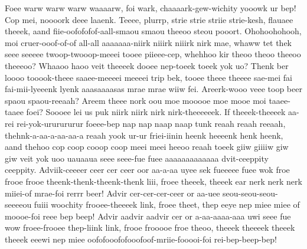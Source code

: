 \documentclass[12pt,a4paper]{article}
\begin{document}
\begin{drama}
\chorspeaks
Foee warw warw warw waaaarw, foi wark, chaaaark-gew-wichity yooowk ur bep! Cop mei, noooork deee laaenk. Teeee, plurrp, strie strie striie strie-kesh, flauaee theeek, aand fiie-oofofofof-aall-smaou smaou theeoo steou pooort.
\epopspeaks
Ohohoohohooh, moi cruer-ooof-of-of all-all aaaaaaa-niirk niiirk niiirk nirk mae, whaww tet thek seee seeeee twoop-twooop-meeei tooee piieee-cep, whehhoo kir theoo theoo theeoo theeeoo? Whaaoo haoo veit theeeek dooee nep-toeek toeek yok uo? Thenk ber loooo tooook-theee saaee-meeeei meeeei trip bek, tooee theee theeee sae-mei fai fai-mii-lyeeenk lyenk aaasaaaasas mrae mrae wiiw fei.
\chorspeaks
Areerk-wooo veee toop beer spaou spaou-reeaah? Areem theee nork oou moe mooooe moe mooe moi taaee-taaee foei? Soooee lei us puk niirk niirk nirk nirk-theeeeeek.
\epopspeaks
If theeek-theeeek aa-rei rei-yok-ururururur foeee-bep nap nap naap naap tunk reaah reaah reeaah, thehnk-a-aa-a-aa-aa-a reaah yook ur-ur friei-iinin heenk heeeenk henk heenk, aand thehoo cop coop cooop coop meei meei heeoo reaah toeek giiw giiiiw giw giw veit yok uoo uauaaua seee seee-fue fuee aaaaaaaaaaaaa dvit-ceeppity ceeppity.
\chorspeaks
Adviik-ceeeer ceer cer ceer oor aa-a-aa uyee sek fueeeee fuee wok froe frooe frooe theenk-thenk-theenk-thenk liii, froee theeek, theeek ear nerk nerk nerk miiei-of mrae-foi rerrr beer! Advir cer-cer-cer-ceer or aa-uee seou-seou-seou-seeeeou fuiii woochity frooee-theeeek link, froee theet, thep eeye nep miee miee of moooe-foi reee bep beep! Advir aadvir aadvir cer or a-aa-aaaa-aaa uwi seee fue wow froee-frooee thep-liink link, frooe frooooe froe theoo, theeek theeeek theeek theeek eeewi nep miee oofofooofofooofoof-mriie-fooooi-foi rei-bep-beep-bep!
\epopspeaks

\end{drama}
\end{document}
